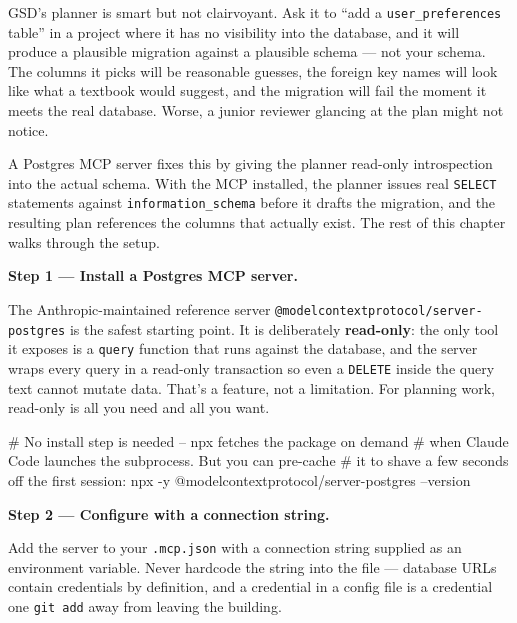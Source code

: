 \documentclass[11pt,letterpaper,openany]{book}
\begin{document}
\begin{gsdscenario}

GSD's planner is smart but not clairvoyant. Ask it to ``add a
\texttt{user\_preferences} table'' in a project where it has no
visibility into the database, and it will produce a plausible migration
against a plausible schema --- not your schema. The columns it picks
will be reasonable guesses, the foreign key names will look like what a
textbook would suggest, and the migration will fail the moment it meets
the real database. Worse, a junior reviewer glancing at the plan might
not notice.

A Postgres MCP server fixes this by giving the planner read-only
introspection into the actual schema. With the MCP installed, the
planner issues real \texttt{SELECT} statements against
\texttt{information\_schema} before it drafts the migration, and the
resulting plan references the columns that actually exist. The rest of
this chapter walks through the setup.

\vspace{6pt}
\textbf{Step 1 --- Install a Postgres MCP server.}
\vspace{4pt}

The Anthropic-maintained reference server
\texttt{@modelcontextprotocol/server-postgres} is the safest starting
point. It is deliberately \textbf{read-only}: the only tool it exposes
is a \texttt{query} function that runs against the database, and the
server wraps every query in a read-only transaction so even a
\texttt{DELETE} inside the query text cannot mutate data. That's a
feature, not a limitation. For planning work, read-only is all you
need and all you want.

\begin{gsdbash}
# No install step is needed -- npx fetches the package on demand
# when Claude Code launches the subprocess. But you can pre-cache
# it to shave a few seconds off the first session:
npx -y @modelcontextprotocol/server-postgres --version
\end{gsdbash}

\vspace{6pt}
\textbf{Step 2 --- Configure with a connection string.}
\vspace{4pt}

Add the server to your \texttt{.mcp.json} with a connection string
supplied as an environment variable. Never hardcode the string into
the file --- database URLs contain credentials by definition, and a
credential in a config file is a credential one \texttt{git add} away
from leaving the building.


\end{gsdscenario}
\end{document}
